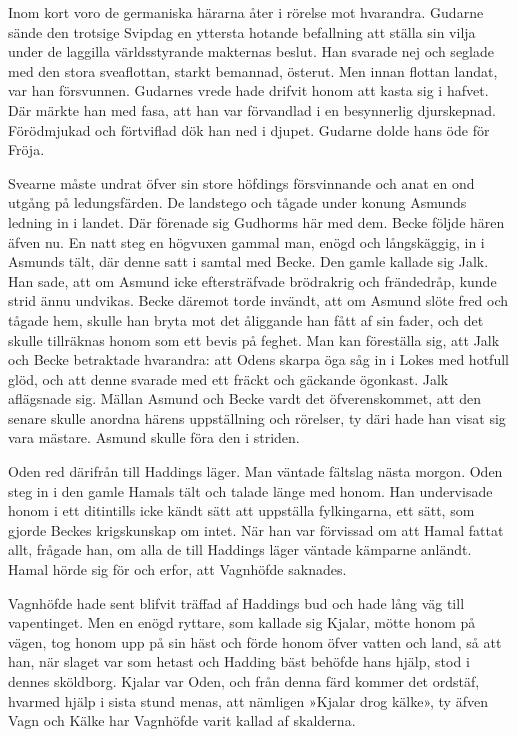 Inom kort voro de germaniska härarna åter i rörelse mot hvarandra.
Gudarne sände den trotsige Svipdag en yttersta hotande befallning att
ställa sin vilja under de laggilla världsstyrande makternas beslut. Han
svarade nej och seglade med den stora sveaflottan, starkt bemannad,
österut. Men innan flottan landat, var han försvunnen. Gudarnes vrede
hade drifvit honom att kasta sig i hafvet. Där märkte han med fasa, att
han var förvandlad i en besynnerlig djurskepnad. Förödmjukad och
förtviflad dök han ned i djupet. Gudarne dolde hans öde för Fröja.

Svearne måste undrat öfver sin store höfdings försvinnande och anat en
ond utgång på ledungsfärden. De landstego och tågade under konung
Asmunds ledning in i landet. Där förenade sig Gudhorms här med dem.
Becke följde hären äfven nu. En natt steg en högvuxen gammal man, enögd
och långskäggig, in i Asmunds tält, där denne satt i samtal med Becke.
Den gamle kallade sig Jalk. Han sade, att om Asmund icke eftersträfvade
brödrakrig och frändedråp, kunde strid ännu undvikas. Becke däremot
torde invändt, att om Asmund slöte fred och tågade hem, skulle han bryta
mot det åliggande han fått af sin fader, och det skulle tillräknas honom
som ett bevis på feghet. Man kan föreställa sig, att Jalk och Becke
betraktade hvarandra: att Odens skarpa öga såg in i Lokes med hotfull
glöd, och att denne svarade med ett fräckt och gäckande ögonkast. Jalk
aflägsnade sig. Mällan Asmund och Becke vardt det öfverenskommet, att
den senare skulle anordna härens uppställning och rörelser, ty däri hade
han visat sig vara mästare. Asmund skulle föra den i striden.

Oden red därifrån till Haddings läger. Man väntade fältslag nästa
morgon. Oden steg in i den gamle Hamals tält
\protect\hypertarget{lb1625905.xhtmlux5cux23start166}{}{}\protect\hypertarget{lb1625905.xhtmlux5cux23start166-a}{}{}\protect\hypertarget{lb1625905.xhtmlux5cux23start166-b}{}{}\protect\hypertarget{lb1625905.xhtmlux5cux23start166-c}{}{}\protect\hypertarget{lb1625905.xhtmlux5cux23start166-d}{}{}
och talade länge med honom. Han undervisade honom i ett ditintills icke
kändt sätt att uppställa fylkingarna, ett sätt, som gjorde Beckes
krigskunskap om intet. När han var förvissad om att Hamal fattat allt,
frågade han, om alla de till Haddings läger väntade kämparne anländt.
Hamal hörde sig för och erfor, att Vagnhöfde saknades.

Vagnhöfde hade sent blifvit träffad af Haddings bud och hade lång väg
till vapentinget. Men en enögd ryttare, som kallade sig Kjalar, mötte
honom på vägen, tog honom upp på sin häst och förde honom öfver vatten
och land, så att han, när slaget var som hetast och Hadding bäst behöfde
hans hjälp, stod i dennes sköldborg. Kjalar var Oden, och från denna
färd kommer det ordstäf, hvarmed hjälp i sista stund menas, att nämligen
»Kjalar drog kälke», ty äfven Vagn och Kälke har Vagnhöfde varit kallad
af skalderna.

